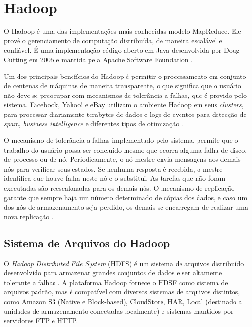 \section{Hadoop}

O Hadoop é uma das  implementações mais conhecidas modelo MapReduce. Ele provê o gerenciamento de computação distribuída, de maneira escalável e confiável. É uma implementação código aberto em Java  desenvolvida por Doug Cutting em 2005 e mantida pela Apache Software Foundation \cite{White:2009, Hadoop:2010}.

Um dos principais benefícios do Hadoop é permitir o processamento em conjunto de centenas de máquinas de maneira transparente, o que significa que o usuário não deve se preocupar com mecanismos de tolerância a falhas, que é provido pelo sistema. %
Facebook, Yahoo! e eBay utilizam o ambiente Hadoop em seus \textit{clusters}, para processar diariamente terabytes de dados e logs de eventos para detecção de \textit{spam}, \textit{business intelligence} e diferentes tipos de otimização \cite{Cherkasova:2011}.

O mecanismo de tolerância a falhas implementado pelo sistema, permite que o trabalho do usuário possa ser concluído mesmo que ocorra alguma falha de disco, de processo ou de nó. Periodicamente, o nó mestre envia mensagens aos demais nós para verificar seus estados. Se nenhuma resposta é recebida, o mestre identifica que houve falha neste nó e o substitui. 
As tarefas que não foram executadas são reescalonadas para os demais nós. O mecanismo de replicação garante que sempre haja um número determinado de cópias dos dados, e caso um dos nós de armazenamento seja perdido, os demais se encarregam de realizar uma nova replicação \cite{White:2009}.


\subsection{Sistema de Arquivos do Hadoop}


O \textit{ Hadoop Distributed File System} (HDFS) é um sistema de arquivos distribuído desenvolvido para armazenar grandes conjuntos de dados e ser altamente tolerante a falhas \cite{White:2009}.
A plataforma Hadoop fornece o HDSF como sistema de arquivos padrão, mas é compatível com diversos sistemas de arquivos distintos, como Amazon S3 (Native e Block-based), CloudStore, HAR, Local (destinado a unidades de armazenamento conectadas localmente) e sistemas mantidos por servidores FTP e HTTP.

